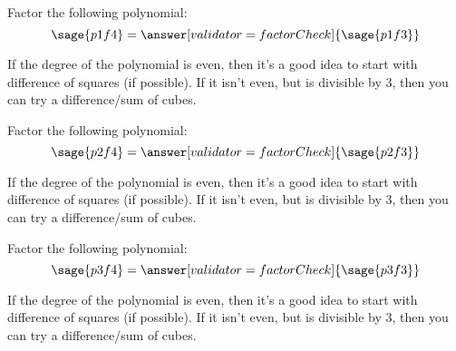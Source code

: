 \documentclass{ximera}
\begin{document}
\begin{problem}
Factor the following polynomial:
    \[
        \sage{p1f4} = \answer[validator=factorCheck]{\sage{p1f3}}
    \]
    \begin{feedback}
        If the degree of the polynomial is even, then it's a good idea to start with difference of squares (if possible). If it isn't even, but is divisible by 3, then you can try a difference/sum of cubes.
    \end{feedback}
\end{problem}

\begin{problem}
Factor the following polynomial:
    \[
        \sage{p2f4} = \answer[validator=factorCheck]{\sage{p2f3}}
    \]
    \begin{feedback}
        If the degree of the polynomial is even, then it's a good idea to start with difference of squares (if possible). If it isn't even, but is divisible by 3, then you can try a difference/sum of cubes.
    \end{feedback}
\end{problem}



\begin{problem}
Factor the following polynomial:
    \[
        \sage{p3f4} = \answer[validator=factorCheck]{\sage{p3f3}}
    \]
    \begin{feedback}
        If the degree of the polynomial is even, then it's a good idea to start with difference of squares (if possible). If it isn't even, but is divisible by 3, then you can try a difference/sum of cubes.
    \end{feedback}
\end{problem}
\end{document}
